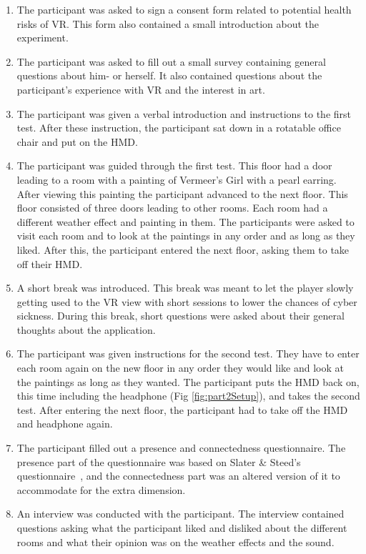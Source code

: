 \documentclass[a4paper]{article}
\begin{document}
\begin{enumerate}
\item The participant was asked to sign a consent form related to potential health risks of VR. This form also contained a small introduction about the experiment.
\item The participant was asked to fill out a small survey containing general questions about him- or herself. It also contained questions about the participant's experience with VR and the interest in art.
\item The participant was given a verbal introduction and instructions to the first test. After these instruction, the participant sat down in a rotatable office chair and put on the HMD.
\item The participant was guided through the first test. This floor had a door leading to a room with a painting of Vermeer's Girl with a pearl earring. After viewing this painting the participant advanced to the next floor. This floor consisted of three doors leading to other rooms. Each room had a different weather effect and painting in them. The participants were asked to visit each room and to look at the paintings in any order and as long as they liked. After this, the participant entered the next floor, asking them to take off their HMD.
\item A short break was introduced. This break was meant to let the player slowly getting used to the VR view with short sessions to lower the chances of cyber sickness. During this break, short questions were asked about their general thoughts about the application. 
\item The participant was given instructions for the second test. They have to enter each room again on the new floor in any order they would like and look at the paintings as long as they wanted. The participant puts the HMD back on, this time including the headphone (Fig \ref{fig:part2Setup}), and takes the second test. After entering the next floor, the participant had to take off the HMD and headphone again.
\item The participant filled out a presence and connectedness questionnaire. The presence part of the questionnaire was based on Slater \& Steed's questionnaire~\cite{slater}, and the connectedness part was an altered version of it to accommodate for the extra dimension. %
\item An interview was conducted with the participant. The interview contained questions asking what the participant liked and disliked about the different rooms and what their opinion was on the weather effects and the sound.

\end{enumerate}
\end{document}
